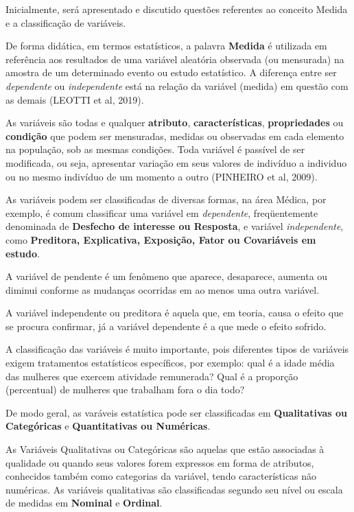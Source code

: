 Inicialmente, será apresentado e discutido questões referentes ao conceito Medida e a classificação de variáveis.\vskip0.3cm

De forma didática, em termos estatísticos, a palavra \textbf{Medida} é utilizada em referência aos resultados de uma variável aleatória observada (ou mensurada) na amostra de um determinado evento ou estudo estatístico. A diferença entre ser \textit{dependente} ou \textit{independente} está na relação da variável (medida) em questão com as demais (LEOTTI et al, 2019).\vskip0.3cm

As variáveis são todas e qualquer \textbf{atributo}, \textbf{características}, \textbf{propriedades} ou \textbf{condição} que podem ser mensuradas, medidas ou observadas em cada elemento na população, sob as mesmas condições. Toda variável é passível de ser modificada, ou seja, apresentar variação em seus valores de indivíduo a individuo ou no mesmo indivíduo de um momento a outro (PINHEIRO et al, 2009).\vskip0.3cm 

As variáveis podem ser classificadas de diversas formas, na área Médica, por exemplo, é comum classificar uma variável em  \textit{dependente}, freqüentemente denominada de \textbf{Desfecho de interesse ou Resposta}, e variável \textit{independente}, como \textbf{Preditora, Explicativa, Exposição, Fator ou Covariáveis em estudo}. \vskip0.3cm 


A variável de pendente é um fenômeno que aparece, desaparece, aumenta ou diminui conforme as mudanças ocorridas em ao menos uma outra variável.\vskip0.3cm 

A variável independente ou preditora é aquela que, em teoria, causa o efeito que se procura confirmar, já a variável dependente é a que mede o efeito sofrido.\vskip0.3cm



A classificação das variáveis é muito importante, pois diferentes tipos de variáveis exigem tratamentos estatísticos específicos, por exemplo: qual é a idade média das mulheres
que exercem atividade remunerada? Qual é a proporção (percentual) de mulheres que trabalham fora o dia todo?
\vskip0.3cm



\inic De modo geral, as varáveis estatística pode ser classificadas em \textbf{Qualitativas ou Categóricas} e \textbf{Quantitativas ou Numéricas}.\vskip0.3cm

\inic As Variáveis Qualitativas ou Categóricas são aquelas que estão associadas à qualidade ou quando seus valores forem expressos em forma de atributos, conhecidos também como categorias da variável, tendo características não numéricas. As variáveis qualitativas são classificadas segundo seu nível ou escala de medidas em \textbf{Nominal} e \textbf{Ordinal}.\vskip0.3cm


